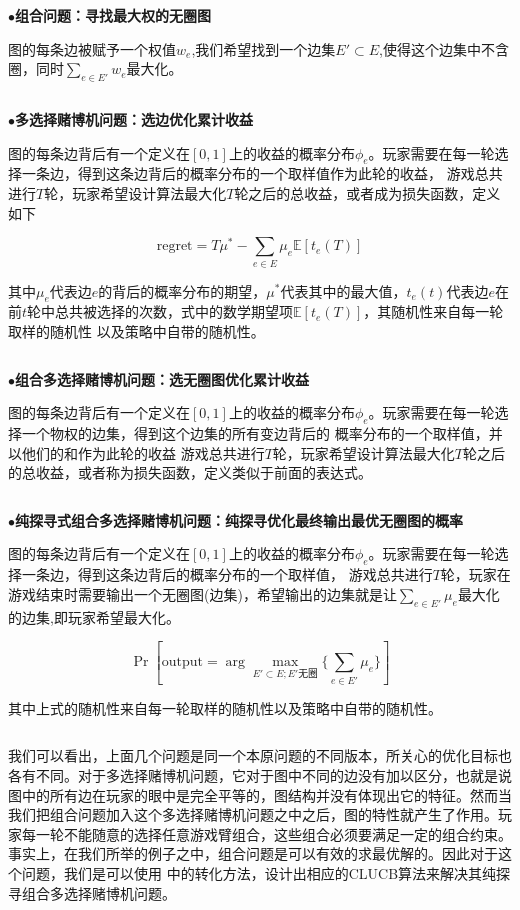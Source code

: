 \documentclass[bachelor]{thuthesis}
\begin{document}
$\ $

$\bullet$\textbf{组合问题：寻找最大权的无圈图}

图的每条边被赋予一个权值$w_e$,我们希望找到一个边集$E'\subset E$,使得这个边集中不含圈，同时$\sum_{e\in E'}w_e$最大化。

$\ $

$\bullet$\textbf{多选择赌博机问题：选边优化累计收益}

图的每条边背后有一个定义在$[0,1]$上的收益的概率分布$\phi_e$。玩家需要在每一轮选择一条边，得到这条边背后的概率分布的一个取样值作为此轮的收益，
游戏总共进行$T$轮，玩家希望设计算法最大化$T$轮之后的总收益，或者成为损失函数，定义如下

\[\text{regret}=T\mu^*-\sum_{e\in E}\mu_e \mathbb{E}[t_e(T)]\]

其中$\mu_e$代表边$e$的背后的概率分布的期望，$\mu^*$代表其中的最大值，$t_{e}(t)$代表边$e$在前$t$轮中总共被选择的次数，式中的数学期望项$\mathbb{E}[t_e(T)]$，其随机性来自每一轮取样的随机性
以及策略中自带的随机性。

$\ $

$\bullet$\textbf{组合多选择赌博机问题：选无圈图优化累计收益}

图的每条边背后有一个定义在$[0,1]$上的收益的概率分布$\phi_e$。玩家需要在每一轮选择一个物权的边集，得到这个边集的所有变边背后的
概率分布的一个取样值，并以他们的和作为此轮的收益
游戏总共进行$T$轮，玩家希望设计算法最大化$T$轮之后的总收益，或者称为损失函数，定义类似于前面的表达式。

$\ $

$\bullet$\textbf{纯探寻式组合多选择赌博机问题：纯探寻优化最终输出最优无圈图的概率}

图的每条边背后有一个定义在$[0,1]$上的收益的概率分布$\phi_e$。玩家需要在每一轮选择一条边，得到这条边背后的概率分布的一个取样值，
游戏总共进行$T$轮，玩家在游戏结束时需要输出一个无圈图(边集)，希望输出的边集就是让$\sum_{e\in E'}\mu_e$最大化的边集,即玩家希望最大化。

\[\Pr\left[\text{output}=\arg\max_{E'\subset E; E'\text{无圈}}\{\sum_{e\in E'}\mu_e\}\right]\]

其中上式的随机性来自每一轮取样的随机性以及策略中自带的随机性。

$\ $

我们可以看出，上面几个问题是同一个本原问题的不同版本，所关心的优化目标也各有不同。对于多选择赌博机问题，它对于图中不同的边没有加以区分，也就是说图中的所有边在玩家的眼中是完全平等的，图结构并没有体现出它的特征。然而当我们把组合问题加入这个多选择赌博机问题之中之后，图的特性就产生了作用。玩家每一轮不能随意的选择任意游戏臂组合，这些组合必须要满足一定的组合约束。事实上，在我们所举的例子之中，组合问题是可以有效的求最优解的。因此对于这个问题，我们是可以使用
\cite{cpemab}中的转化方法，设计出相应的CLUCB算法来解决其纯探寻组合多选择赌博机问题。
\end{document}
